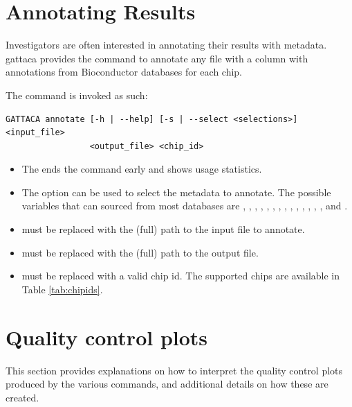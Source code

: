 \section{Annotating Results}
Investigators are often interested in annotating their results with metadata. \gls{gattaca} provides the  command to annotate any  file with a  column with annotations from Bioconductor databases for each chip.

The command is invoked as such:
\begin{lstlisting}
GATTACA annotate [-h | --help] [-s | --select <selections>] <input_file>
                 <output_file> <chip_id>
\end{lstlisting}
\begin{itemize}
    \item The  ends the command early and shows usage statistics.
    \item The  option can be used to select the metadata to annotate. The possible variables that can sourced from most databases are , , , , , , , , , , , , , ,  and .
    \item {} must be replaced with the (full) path to the input  file to annotate.
    \item {} must be replaced with the (full) path to the output  file.
    \item {} must be replaced with a valid chip id. The supported chips are available in Table \ref{tab:chipids}.
\end{itemize}

\section{Quality control plots}
\label{sec:QCplots}
This section provides explanations on how to interpret the quality control plots produced by the various commands, and additional details on how these are created.

